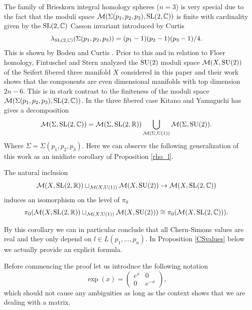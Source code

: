 The family of Brieskorn integral homology spheres ($n=3$) is very special due to the fact that the moduli space $\mathcal{M}(\Sigma(p_1,p_2,p_3), \operatorname{SL}(2,\mathbb{C}))$ is finite with cardinality given by the $\operatorname{SL}(2,\mathbb{C})$ Casson invariant introduced by Curtis \cite{Curtis01,Curtis03} $$\lambda_{\operatorname{SL}(2,\mathbb{C})}(\Sigma(p_1,p_2,p_3))=(p_1-1)(p_2-1)(p_3-1)/4.$$ This is shown by Boden and Curtis \cite{BodenCurtis06}. Prior to this and in relation to Floer homology, Fintuschel and Stern \cite{FintushelStern90} analyzed the $\operatorname{SU}(2)$ moduli space $\mathcal{M}(X,\operatorname{SU}(2))$ of the Seifert fibered three manifold $X$ considered in this paper and their work shows that the components are even dimensional manifolds with top dimension $2n-6.$ This is in stark contrast to the finiteness of the moduli space $\mathcal{M}(\Sigma(p_1,p_2,p_3), \operatorname{SL}(2,\mathbb{C}))$.  In the three fibered case Kitano and Yamaguchi \cite{KitanoYamaguchi16} has gives a decomposition
\begin{equation}
\mathcal{M}(\Sigma,\operatorname{SL}(2,\mathbb{C}))=\mathcal{M}(\Sigma,\operatorname{SL}(2,\mathbb{R})) \bigcup_{\mathcal{M}(\Sigma,\text{U}(1))} \mathcal{M}(\Sigma,\operatorname{SU}(2)).
\end{equation}
Where $\Sigma=\Sigma(p_1,p_2,p_3).$ Here we can observe the following generalization of this work as an imidiate corollary of Proposition \ref{rho_l}.

\begin{theorem} \label{thm:decompSL2C}
The natural inclusion
$$ \mathcal{M}(X,\operatorname{SL}(2,\mathbb{R}))\sqcup_{\mathcal{M}(X,\text{U}(1))} \mathcal{M}(X,\operatorname{SU}(2)) \rightarrow  \mathcal{M}(X,\operatorname{SL}(2,\mathbb{C}))$$
induces an isomorphism on the level of $\pi_0$
$$ \pi_0(\mathcal{M}(X,\operatorname{SL}(2,\mathbb{R}))\sqcup_{\mathcal{M}(X,\text{U}(1))} \mathcal{M}(X,\operatorname{SU}(2))) \cong \pi_0(\mathcal{M}(X,\operatorname{SL}(2,\mathbb{C}))).$$
\end{theorem}
By this corollary we can in particular conclude that all Chern-Simons values are real and they only depend on $l\in  L(p_1,...,p_n)$. In Proposition \ref{CSvalues} below we actually provide an explicit formula.

Before commencing the proof let us introduce the following notation
\begin{equation} \exp(x)=\begin{pmatrix} e^{x} & 0
\\ 0 &  e^{-x} \end{pmatrix}, \end{equation}
which should not cause any ambiguities as long as the context shows that we are dealing with a matrix.


